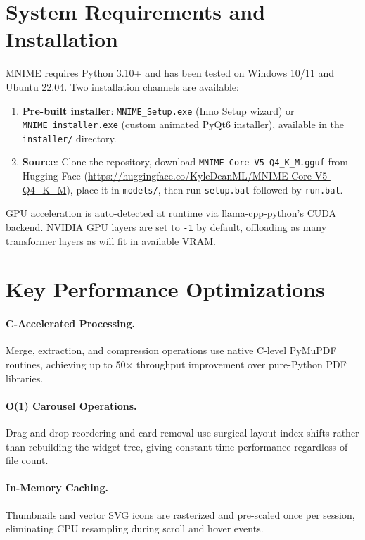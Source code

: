\documentclass[11pt]{article}
\begin{document}
\appendix
\small

\section{System Requirements and Installation}
\label{app:install}

MNIME requires Python 3.10+ and has been tested on Windows 10/11 and Ubuntu
22.04.
Two installation channels are available:
\begin{enumerate}
    \item \textbf{Pre-built installer}: \texttt{MNIME\_Setup.exe}
    (Inno Setup wizard) or \texttt{MNIME\_installer.exe} (custom animated
    PyQt6 installer), available in the \texttt{installer/} directory.
    \item \textbf{Source}: Clone the repository, download
    \texttt{MNIME-Core-V5-Q4\_K\_M.gguf} from Hugging Face
    (\url{https://huggingface.co/KyleDeanML/MNIME-Core-V5-Q4_K_M}),
    place it in \texttt{models/}, then run \texttt{setup.bat} followed by
    \texttt{run.bat}.
\end{enumerate}

GPU acceleration is auto-detected at runtime via llama-cpp-python's CUDA
backend. NVIDIA GPU layers are set to \texttt{-1} by default, offloading as
many transformer layers as will fit in available VRAM.

\section{Key Performance Optimizations}
\label{app:perf}

\paragraph{C-Accelerated Processing.}
Merge, extraction, and compression operations use native C-level PyMuPDF
routines, achieving up to 50$\times$ throughput improvement over pure-Python
PDF libraries.

\paragraph{O(1) Carousel Operations.}
Drag-and-drop reordering and card removal use surgical layout-index shifts
rather than rebuilding the widget tree, giving constant-time performance
regardless of file count.

\paragraph{In-Memory Caching.}
Thumbnails and vector SVG icons are rasterized and pre-scaled once per
session, eliminating CPU resampling during scroll and hover events.
\end{document}
